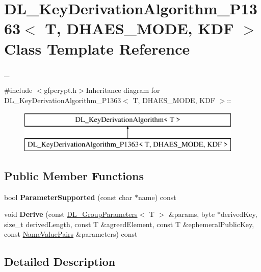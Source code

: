 \hypertarget{class_d_l___key_derivation_algorithm___p1363}{
\section{DL\_\-KeyDerivationAlgorithm\_\-P1363$<$ T, DHAES\_\-MODE, KDF $>$ Class Template Reference}
\label{class_d_l___key_derivation_algorithm___p1363}
}


\_\-  


{\ttfamily \#include $<$gfpcrypt.h$>$}Inheritance diagram for DL\_\-KeyDerivationAlgorithm\_\-P1363$<$ T, DHAES\_\-MODE, KDF $>$::\begin{figure}[H]
\begin{center}
\leavevmode
\includegraphics[height=2cm]{class_d_l___key_derivation_algorithm___p1363}
\end{center}
\end{figure}
\subsection*{Public Member Functions}
\begin{DoxyCompactItemize}
\item 
\hypertarget{class_d_l___key_derivation_algorithm___p1363_a26e4fae8534395866676f030067a70fb}{
bool {\bfseries ParameterSupported} (const char $\ast$name) const }
\label{class_d_l___key_derivation_algorithm___p1363_a26e4fae8534395866676f030067a70fb}

\item 
\hypertarget{class_d_l___key_derivation_algorithm___p1363_a4eab75a03e805972e340340bce6bb7fa}{
void {\bfseries Derive} (const \hyperlink{class_d_l___group_parameters}{DL\_\-GroupParameters}$<$ T $>$ \&params, byte $\ast$derivedKey, size\_\-t derivedLength, const T \&agreedElement, const T \&ephemeralPublicKey, const \hyperlink{class_name_value_pairs}{NameValuePairs} \&parameters) const }
\label{class_d_l___key_derivation_algorithm___p1363_a4eab75a03e805972e340340bce6bb7fa}

\end{DoxyCompactItemize}


\subsection{Detailed Description}
